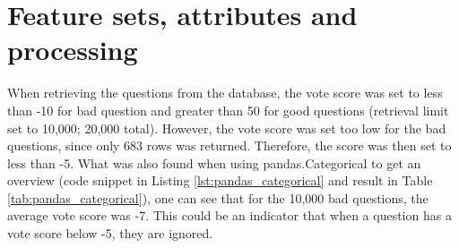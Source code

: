 \begin{comment}
		11. Stemming of data, model creation and gridsearch with SGD			
		12. Model based on 20,000 samples (10k good, 10k bad) - took approx ~3hours for both models
			Model 1 was for all data (no test set). Model 2 was based on train\_test\_split
		13. Added tags column to the used dataset. Added the unprocessed dataset (but html is removed)
		14. Tested out different SVM algorithms (SVC, SGD and LinearSVC)
			Issue was that I managed to overwrite the .csv, so I had to do everything over again
			took approximately 24-36 hours to complete (+ 3days before hand to make everything run smoothly).
		15. Attempted to use optparse, argparse to make it executable. 
			Problem is that it exits after command is run. Need it to continue running to be able to:
				a) create new (or load existing) model
				b) use model from a) to predict quality of entered question (rinse/repeat)
		16. Used while loop instead (loop until exit entered). shortcuts are the same as with argparse, but 
			without the '-' in front (e.g. instead of -e, just press 'e' to exit)
			
		Additional Notes (which might be relevant for the next section):
		
			- issues with setting up environment, installations, etc
			- switching from "good"/"bad" to +/-1 for class label (bcz libsvm)
			- switching from -10/+50 to -5/+50 to get more separation (and more results for bad)
			
		Potentially useful links:
		
		http://billchambers.me/tutorials/2015/01/14/python-nlp-cheatsheet-nltk-scikit-learn.html
		http://stackoverflow.com/questions/28064634/random-state-pseudo-random-numberin-scikit-learn
		http://stackoverflow.com/questions/35382657/my-pipeline-configuration-for-text-classification-using-
		sklearn-in-python
\end{comment}

\section{Feature sets, attributes and processing}
\label{sec:feature_sets}
When retrieving the questions from the database, the vote score was set to less than -10 for bad question and greater than 50 for good questions (retrieval limit set to 10,000; 20,000 total). 
However, the vote score was set too low for the bad questions, since only 683 rows was returned. 
Therefore, the score was then set to less than -5. 
What was also found when using pandas.Categorical to get an overview (code snippet in Listing \ref{lst:pandas_categorical} and result in Table \ref{tab:pandas_categorical}), 
one can see that for the 10,000 bad questions, the average vote score was -7. This could be an indicator that when a question has a vote score below -5, they are ignored.

